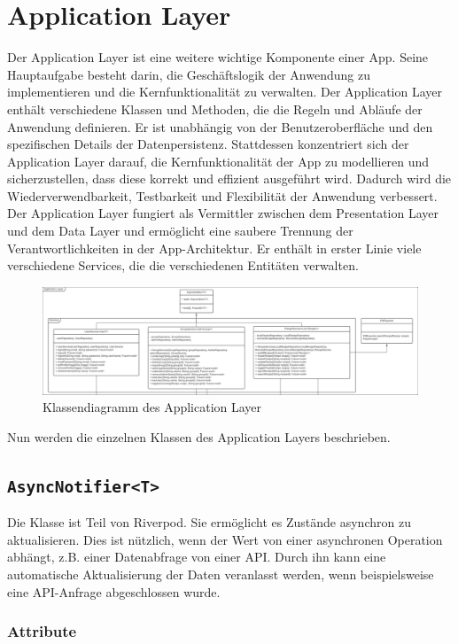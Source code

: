 \documentclass{entwurfsheft}
\begin{document}
\section{Application Layer}
Der Application Layer ist eine weitere wichtige Komponente einer App. Seine Hauptaufgabe besteht darin, die Geschäftslogik der Anwendung zu implementieren und die Kernfunktionalität zu verwalten. Der Application Layer enthält verschiedene Klassen und Methoden, die die Regeln und Abläufe der Anwendung definieren. Er ist unabhängig von der Benutzeroberfläche und den spezifischen Details der Datenpersistenz. Stattdessen konzentriert sich der Application Layer darauf, die Kernfunktionalität der App zu modellieren und sicherzustellen, dass diese korrekt und effizient ausgeführt wird. Dadurch wird die Wiederverwendbarkeit, Testbarkeit und Flexibilität der Anwendung verbessert. Der Application Layer fungiert als Vermittler zwischen dem Presentation Layer und dem Data Layer und ermöglicht eine saubere Trennung der Verantwortlichkeiten in der App-Architektur.
Er enthält in erster Linie viele verschiedene Services, die die verschiedenen Entitäten verwalten.
\begin{figure}[htp]
    \centering
    \includegraphics[width = \textwidth]{images/applicationLayer/applicationLayer.pdf}
    \caption{Klassendiagramm des Application Layer}
    \label{fig:application-layer}
\end{figure}

Nun werden die einzelnen Klassen des Application Layers beschrieben.
\newpage
\subsection{\texttt{AsyncNotifier<T>}}
\label{sec:AsyncNotifier}
Die Klasse ist Teil von Riverpod. Sie ermöglicht es Zustände asynchron zu aktualisieren. Dies ist nützlich, wenn der Wert von einer asynchronen Operation abhängt, z.B. einer Datenabfrage von einer API. Durch ihn kann eine automatische Aktualisierung der Daten veranlasst werden, wenn beispielsweise eine API-Anfrage abgeschlossen wurde.
\subsubsection*{Attribute}
\end{document}
